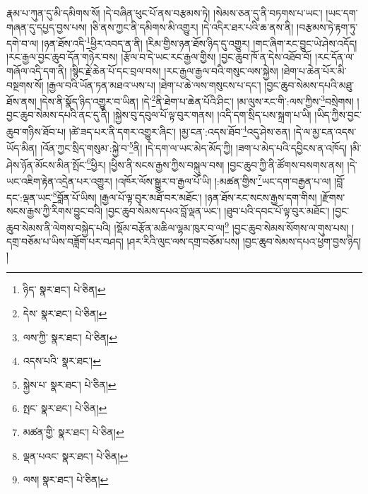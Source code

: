 རྣམ་པ་ཀུན་དུ་མི་དམིགས་སོ། །དེ་བཞིན་ཕུང་པོ་ནས་བརྩམས་ཏེ། །སེམས་ཅན་དུ་ནི་བཏགས་པ་ཡང་། །ཡང་དག་གཞན་དུ་དཔྱད་བྱས་པས། །ཅི་ནས་ཀྱང་ནི་དམིགས་མི་འགྱུར། །དེ་འདིར་ཐར་པའི་ཆ་ནས་ནི། །བརྩམས་ཏེ་རྟག་ཏུ་དགེ་བ་ལ། །ཉན་ཐོས་འདི་\footnote{ཉིད་  སྣར་ཐང་།  པེ་ཅིན། }ཕྱིར་འབད་ན་ནི། །རིམ་གྱིས་ཉན་ཐོས་ཉིད་དུ་འགྱུར། །གང་ཞིག་རང་བྱུང་ཡེ་ཤེས་འདོད། །རང་རྒྱལ་བྱང་ཆུབ་དོན་གཉེར་བས། །རྩོལ་བ་དེ་ཡང་རང་རྒྱལ་གྱིས། །བྱང་ཆུབ་ཁོ་ན་དེས་འཐོབ་བོ། །རང་དོན་ལ་གཞོལ་འདི་དག་ནི། །སྙིང་རྗེ་ཆེན་པོ་དང་བྲལ་བས། །རང་རྒྱལ་རྒྱལ་བའི་གསུང་ལས་སྐྱེས། །ཐེག་པ་ཆེན་པོར་མི་བསྔགས་སོ། །རྒྱལ་བའི་ཡོན་ཏན་མཐའ་ཡས་པ། །ཐེག་པ་ཆེ་ལས་གསུངས་པ་དང་། །བྱང་ཆུབ་སེམས་དཔའི་མཐུ་ཐོས་ནས། །དེས་ནི་སྣོད་ཉིད་འགྱུར་བ་ཡིན། །དེ་\footnote{དེས་  སྣར་ཐང་།  པེ་ཅིན། }ནི་ཐེག་པ་ཆེན་པོའི་ཤིང་། །མ་ལུས་རང་གི་:ལས་ཀྱིས་\footnote{ལས་ཀྱི་  སྣར་ཐང་།  པེ་ཅིན། }བསྲེགས། །བྱང་ཆུབ་སེམས་དཔའི་ནང་དུ་ནི། །སྐྱེས་བུ་དབུལ་པོ་ལྟ་བུར་གནས། །འདི་དག་སྲིད་པས་སྐྲག་པ་ཡི། །ཡིད་ཀྱིས་བྱང་ཆུབ་གཉིས་ཐོབ་པ། །ཚེ་ཟད་པར་ནི་དགར་འགྱུར་ཞིང་། །མྱ་ངན་:འདས་ཐོབ་\footnote{འདས་པའི་  སྣར་ཐང་། }འདུ་ཤེས་ཅན། །དེ་ལ་མྱ་ངན་འདས་ཡོད་མིན། །འོན་ཀྱང་སྲིད་གསུམ་:སྐྱེ་བ་\footnote{སྐྱེས་པ་  སྣར་ཐང་།  པེ་ཅིན། }ནི། །དེ་དག་ལ་ཡང་མེད་མོད་ཀྱི། །ཟག་པ་མེད་པའི་དབྱིངས་ན་འཁོད། །མི་ཤེས་ཉོན་མོངས་མིན་སྤོང་\footnote{སྤང་  སྣར་ཐང་།  པེ་ཅིན། }ཕྱིར། །ཕྱིས་ནི་སངས་རྒྱས་ཀྱིས་བསྐུལ་བས། །བྱང་ཆུབ་ཀྱི་ནི་ཚོགས་བསགས་ནས། །དེ་ཡང་འཇིག་རྟེན་འདྲེན་པར་འགྱུར། །འཁོར་ལོས་སྒྱུར་བ་རྒྱལ་པོ་ཡི། །:མཚན་གྱིས་\footnote{མཚན་གྱི་  སྣར་ཐང་།  པེ་ཅིན། }ཡང་དག་བརྒྱན་པ་ལ། །བློ་དང་:ལྡན་ཡང་\footnote{ལྡན་པའང་  སྣར་ཐང་།  པེ་ཅིན། }བློན་པོ་ཡིས། །རྒྱལ་པོ་ལྟ་བུར་མཐོ་བར་མཐོང་། །ཉན་ཐོས་རང་སངས་རྒྱས་དག་གིས། །རྫོགས་སངས་རྒྱས་ཀྱི་རིགས་བྱུང་བའི། །བྱང་ཆུབ་སེམས་དཔའ་བློ་ལྡན་ཡང་། །ཐུབ་པའི་དབང་པོ་ལྟ་བུར་མཐོང་། །བྱང་ཆུབ་སེམས་ནི་ལེགས་བསྐྱེད་པའི། །སྡོམ་བརྩོན་མཆིལ་ལྷམ་ཁུར་བ་ལ།\footnote{ལས།  སྣར་ཐང་།  པེ་ཅིན། } །བྱང་ཆུབ་སེམས་སོགས་ལ་གུས་པས། །དགྲ་བཅོམ་པ་ཡིས་བཟློག་པར་བཤད། །ཤར་རིའི་ལུང་ལས་དགྲ་བཅོམ་པས། །བྱང་ཆུབ་སེམས་དཔའ་ཕྱག་བྱས་ཉིད། །
